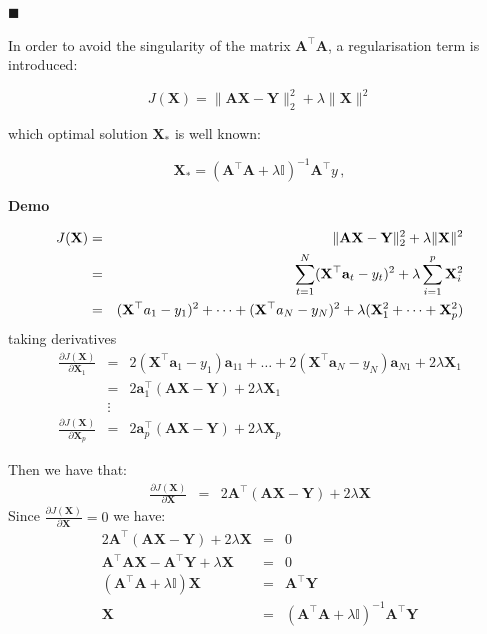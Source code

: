 $\blacksquare$


In order to avoid the singularity of the matrix $\mathbf{A}^\top \mathbf{A}$, a regularisation term is introduced: 

\begin{equation}
\label{eq:RRproblem} 
J(\mathbf{\mathbf{X}}) =  \| \mathbf{A}\mathbf{\mathbf{X}} - \mathbf{Y} \|_2^2  + \lambda
 \| \mathbf{\mathbf{X}}\| ^2
\end{equation}

\noindent which optimal solution $\mathbf{\mathbf{X}}_*$ is well known: 

\begin{equation*}
\label{eq:optsolRR}
\mathbf{\mathbf{X}}_*=(\mathbf{A}^\top \mathbf{A}+\lambda \mathbb{I})^{-1}\mathbf{A}^\top y \, ,
\end{equation*}

\textbf{Demo}\quad

\begin{eqnarray*}
J(\mathbf{\mathbf{X}}) &=&  \| \mathbf{A}\mathbf{\mathbf{X}} - \mathbf{Y} \|_2^2  + \lambda
 \| \mathbf{\mathbf{X}}\| ^2 \\
 &=&  \sum_{t=1}^N (\mathbf{\mathbf{X}}^\top {\bf a}_t-y_t)^2 + \lambda \sum_{i=1}^p \mathbf{X}_i^2 \\
 &=& (\mathbf{X}^\top a_1-y_1)^2 + \dots + (\mathbf{X}^\top a_N-y_N)^2 + \lambda (\mathbf{X}_1^2+\dots+\mathbf{X}_p^2)
\end{eqnarray*}
\noindent taking derivatives
 \begin{eqnarray*}
 \frac{\partial J(\mathbf{\mathbf{X}})}{\partial \mathbf{X}_1}&=& 
 2(\mathbf{X}^\top \mathbf{a}_1-y_1)\mathbf{a}_{11} + \dots + 2(\mathbf{X}^\top \mathbf{a}_N-y_N)\mathbf{a}_{N1} + 2\lambda \mathbf{X}_1 \\
 &=& 2\mathbf{a}_1^\top(\mathbf{A}\mathbf{X}-\mathbf{Y}) + 2\lambda\mathbf{X}_1\\
& \vdots &\\
  \frac{\partial J(\mathbf{\mathbf{X}})}{\partial \mathbf{X}_p}&=& 
 2\mathbf{a}_p^\top(\mathbf{A}\mathbf{X}-\mathbf{Y}) + 2\lambda\mathbf{X}_p 
\end{eqnarray*}

Then we have that:
\begin{eqnarray*}
\frac{\partial J(\mathbf{\mathbf{X}})}{\partial \mathbf{X}}&=& 
 2\mathbf{A}^\top(\mathbf{A}\mathbf{X}-\mathbf{Y}) + 2\lambda\mathbf{X}
\end{eqnarray*}
Since $\frac{\partial J(\mathbf{\mathbf{X}})}{\partial \mathbf{X}}=0$ we have:
\begin{eqnarray*}
2\mathbf{A}^\top(\mathbf{A}\mathbf{X}-\mathbf{Y}) + 2\lambda\mathbf{X}&=&0 \\
\mathbf{A}^\top\mathbf{A}\mathbf{X} - \mathbf{A}^\top\mathbf{Y} + \lambda\mathbf{X} &=& 0\\
(\mathbf{A}^\top\mathbf{A}+\lambda\mathbb{I})\mathbf{X} &=&  \mathbf{A}^\top\mathbf{Y} \\
\mathbf{X} &=& (\mathbf{A}^\top\mathbf{A}+\lambda\mathbb{I})^{-1}  \mathbf{A}^\top\mathbf{Y}
\end{eqnarray*}


